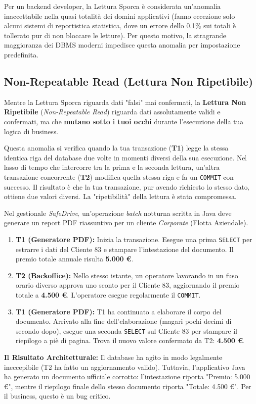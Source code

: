 Per un backend developer, la Lettura Sporca è considerata un'anomalia inaccettabile nella quasi totalità dei domini applicativi (fanno eccezione solo alcuni sistemi di reportistica statistica, dove un errore dello 0.1\% sui totali è tollerato pur di non bloccare le letture). Per questo motivo, la stragrande maggioranza dei DBMS moderni impedisce questa anomalia per impostazione predefinita.

\subsection{Non-Repeatable Read (Lettura Non Ripetibile)}

Mentre la Lettura Sporca riguarda dati "falsi" mai confermati, la \textbf{Lettura Non Ripetibile} (\textit{Non-Repeatable Read}) riguarda dati assolutamente validi e confermati, ma che \textbf{mutano sotto i tuoi occhi} durante l'esecuzione della tua logica di business.

Questa anomalia si verifica quando la tua transazione (\textbf{T1}) legge la stessa identica riga del database due volte in momenti diversi della sua esecuzione. Nel lasso di tempo che intercorre tra la prima e la seconda lettura, un'altra transazione concorrente (\textbf{T2}) modifica quella stessa riga e fa un \texttt{COMMIT} con successo. 
Il risultato è che la tua transazione, pur avendo richiesto lo stesso dato, ottiene due valori diversi. La "ripetibilità" della lettura è stata compromessa.

\begin{example}
Nel gestionale \textit{SafeDrive}, un'operazione \textit{batch} notturna scritta in Java deve generare un report PDF riassuntivo per un cliente \textit{Corporate} (Flotta Aziendale).
\begin{enumerate}
    \item \textbf{T1 (Generatore PDF):} Inizia la transazione. Esegue una prima \texttt{SELECT} per estrarre i dati del Cliente 83 e stampare l'intestazione del documento. Il premio totale annuale risulta \textbf{5.000 €}.
    \item \textbf{T2 (Backoffice):} Nello stesso istante, un operatore lavorando in un fuso orario diverso approva uno sconto per il Cliente 83, aggiornando il premio totale a \textbf{4.500 €}. L'operatore esegue regolarmente il \texttt{COMMIT}.
    \item \textbf{T1 (Generatore PDF):} T1 ha continuato a elaborare il corpo del documento. Arrivato alla fine dell'elaborazione (magari pochi decimi di secondo dopo), esegue una seconda \texttt{SELECT} sul Cliente 83 per stampare il riepilogo a piè di pagina. Trova il nuovo valore confermato da T2: \textbf{4.500 €}.
\end{enumerate}

\textbf{Il Risultato Architetturale:} Il database ha agito in modo legalmente ineccepibile (T2 ha fatto un aggiornamento valido). Tuttavia, l'applicativo Java ha generato un documento ufficiale corrotto: l'intestazione riporta "Premio: 5.000 €", mentre il riepilogo finale dello stesso documento riporta "Totale: 4.500 €". Per il business, questo è un bug critico.
\end{example}

